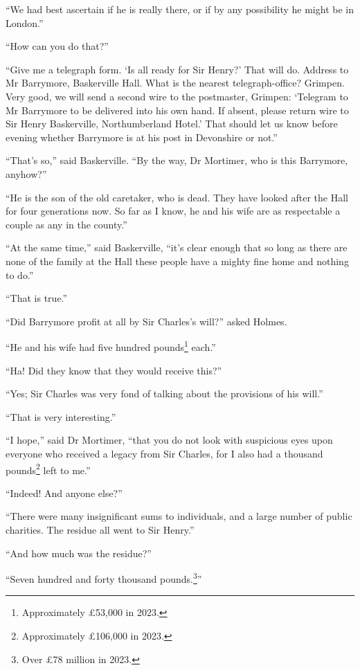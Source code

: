 \documentclass[paper=a5,BCOR=7mm,twoside,DIV=calc,12pt,usegeometry,openany,chapterprefix,endperiod,headings=big]{scrbook} %
\begin{document}
\enquote{We had best ascertain if he is really there, or if by any possibility he might be in London.}

\enquote{How can you do that?}

\enquote{Give me a telegraph form. \enquote{Is all ready for Sir Henry?} That will do. Address to Mr Barrymore, Baskerville Hall. What is the nearest telegraph-office? Grimpen. Very good, we will send a second wire to the postmaster, Grimpen: \enquote{Telegram to Mr Barrymore to be delivered into his own hand. If absent, please return wire to Sir Henry Baskerville, Northumberland Hotel.} That should let us know before evening whether Barrymore is at his post in Devonshire or not.}

\enquote{That's so,} said Baskerville. \enquote{By the way, Dr Mortimer, who is this Barrymore, anyhow?}

\enquote{He is the son of the old caretaker, who is dead. They have looked after the Hall for four generations now. So far as I know, he and his wife are as respectable a couple as any in the county.}

\enquote{At the same time,} said Baskerville, \enquote{it's clear enough that so long as there are none of the family at the Hall these people have a mighty fine home and nothing to do.}

\enquote{That is true.}

\enquote{Did Barrymore profit at all by Sir Charles's will?} asked Holmes.

\enquote{He and his wife had five hundred pounds\footnote{Approximately \pounds 53,000 in 2023.} each.}

\enquote{Ha! Did they know that they would receive this?}

\enquote{Yes; Sir Charles was very fond of talking about the provisions of his will.}

\enquote{That is very interesting.}

\enquote{I hope,} said Dr Mortimer, \enquote{that you do not look with suspicious eyes upon everyone who received a legacy from Sir Charles, for I also had a thousand pounds\footnote{Approximately \pounds 106,000 in 2023.} left to me.}

\enquote{Indeed! And anyone else?}

\enquote{There were many insignificant sums to individuals, and a large number of public charities. The residue all went to Sir Henry.}

\enquote{And how much was the residue?}

\enquote{Seven hundred and forty thousand pounds.\footnote{Over \pounds 78 million in 2023.}}
\end{document}

